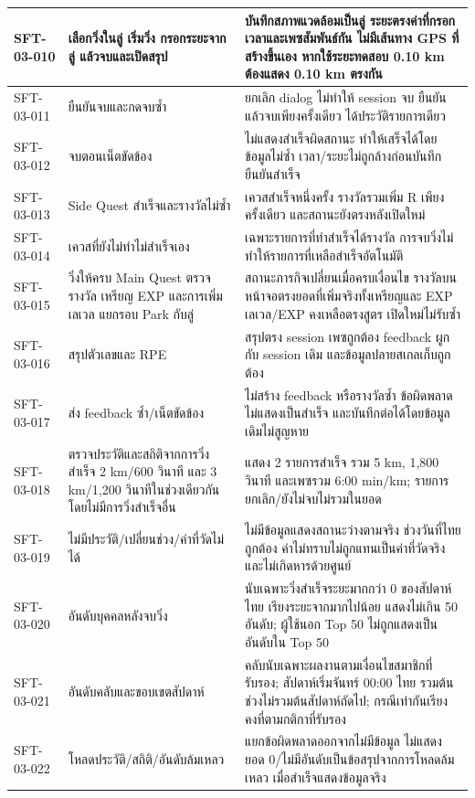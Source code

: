 \begin{longtable}{|>{\raggedright\arraybackslash}p{}|>{\raggedright\arraybackslash}p{}|>{\raggedright\arraybackslash}p{}|}
SFT-03-010 & เลือกวิ่งในลู่ เริ่มวิ่ง กรอกระยะจากลู่ แล้วจบและเปิดสรุป & บันทึกสภาพแวดล้อมเป็นลู่ ระยะตรงค่าที่กรอก เวลาและเพซสัมพันธ์กัน ไม่มีเส้นทาง GPS ที่สร้างขึ้นเอง หากใช้ระยะทดสอบ 0.10 km ต้องแสดง 0.10 km ตรงกัน \\ \hline
SFT-03-011 & ยืนยันจบและกดจบซ้ำ & ยกเลิก dialog ไม่ทำให้ session จบ ยืนยันแล้วจบเพียงครั้งเดียว ได้ประวัติรายการเดียว \\ \hline
SFT-03-012 & จบตอนเน็ตขัดข้อง & ไม่แสดงสำเร็จผิดสถานะ ทำให้เสร็จได้โดยข้อมูลไม่ซ้ำ เวลา/ระยะไม่ถูกล้างก่อนบันทึกยืนยันสำเร็จ \\ \hline
SFT-03-013 & Side Quest สำเร็จและรางวัลไม่ซ้ำ & เควสสำเร็จหนึ่งครั้ง รางวัลรวมเพิ่ม R เพียงครั้งเดียว และสถานะยังตรงหลังเปิดใหม่ \\ \hline
SFT-03-014 & เควสที่ยังไม่ทำไม่สำเร็จเอง & เฉพาะรายการที่ทำสำเร็จได้รางวัล การจบวิ่งไม่ทำให้รายการที่เหลือสำเร็จอัตโนมัติ \\ \hline
SFT-03-015 & วิ่งให้ครบ Main Quest ตรวจรางวัล เหรียญ EXP และการเพิ่มเลเวล แยกรอบ Park กับลู่ & สถานะภารกิจเปลี่ยนเมื่อครบเงื่อนไข รางวัลบนหน้าจอตรงยอดที่เพิ่มจริงทั้งเหรียญและ EXP เลเวล/EXP คงเหลือตรงสูตร เปิดใหม่ไม่รับซ้ำ \\ \hline
SFT-03-016 & สรุปตัวเลขและ RPE & สรุปตรง session เพซถูกต้อง feedback ผูกกับ session เดิม และข้อมูลปลายสเกลเก็บถูกต้อง \\ \hline
SFT-03-017 & ส่ง feedback ซ้ำ/เน็ตขัดข้อง & ไม่สร้าง feedback หรือรางวัลซ้ำ ข้อผิดพลาดไม่แสดงเป็นสำเร็จ และบันทึกต่อได้โดยข้อมูลเดิมไม่สูญหาย \\ \hline
SFT-03-018 & ตรวจประวัติและสถิติจากการวิ่งสำเร็จ 2 km/600 วินาที และ 3 km/1,200 วินาทีในช่วงเดียวกัน โดยไม่มีการวิ่งสำเร็จอื่น & แสดง 2 รายการสำเร็จ รวม 5 km, 1,800 วินาที และเพซรวม 6:00 min/km; รายการยกเลิก/ยังไม่จบไม่รวมในยอด \\ \hline
SFT-03-019 & ไม่มีประวัติ/เปลี่ยนช่วง/ค่าที่วัดไม่ได้ & ไม่มีข้อมูลแสดงสถานะว่างตามจริง ช่วงวันที่ไทยถูกต้อง ค่าไม่ทราบไม่ถูกแทนเป็นค่าที่วัดจริง และไม่เกิดหารด้วยศูนย์ \\ \hline
SFT-03-020 & อันดับบุคคลหลังจบวิ่ง & นับเฉพาะวิ่งสำเร็จระยะมากกว่า 0 ของสัปดาห์ไทย เรียงระยะจากมากไปน้อย แสดงไม่เกิน 50 อันดับ; ผู้ใช้นอก Top 50 ไม่ถูกแสดงเป็นอันดับใน Top 50 \\ \hline
SFT-03-021 & อันดับคลับและขอบเขตสัปดาห์ & คลับนับเฉพาะผลงานตามเงื่อนไขสมาชิกที่รับรอง; สัปดาห์เริ่มจันทร์ 00:00 ไทย รวมต้นช่วงไม่รวมต้นสัปดาห์ถัดไป; กรณีเท่ากันเรียงคงที่ตามกติกาที่รับรอง \\ \hline
SFT-03-022 & โหลดประวัติ/สถิติ/อันดับล้มเหลว & แยกข้อผิดพลาดออกจากไม่มีข้อมูล ไม่แสดงยอด 0/ไม่มีอันดับเป็นข้อสรุปจากการโหลดล้มเหลว เมื่อสำเร็จแสดงข้อมูลจริง \\ \hline
\end{longtable}
\endgroup

